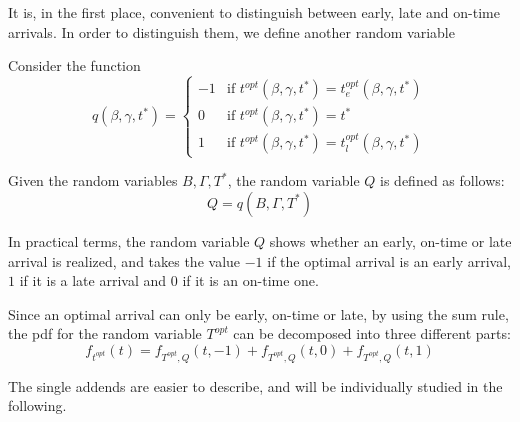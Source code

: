 It is, in the first place,
convenient to distinguish between early, late and on-time arrivals.
In order to distinguish them, we define another random variable
\begin{definition}
  Consider the function
  \begin{equation*}
    q(\beta, \gamma, t^*) =
    \begin{cases}
      -1 & \text{if } t^{opt}(\beta, \gamma, t^*) = t_e^{opt}(\beta, \gamma, t^*) \\
      0 & \text{if } t^{opt}(\beta, \gamma, t^*) = t^* \\
      1 & \text{if } t^{opt}(\beta, \gamma, t^*) = t_l^{opt}(\beta, \gamma, t^*)
    \end{cases}
  \end{equation*}

  Given the random variables \(B, \Gamma, T^*\), the random variable \(Q\) is defined as follows:
  \begin{equation*}
    Q  = q(B, \Gamma, T^*)
  \end{equation*}
\end{definition}

In practical terms, the random variable \(Q\) shows whether an early, on-time or late arrival is realized,
and takes the value \(-1\) if the optimal arrival is an early arrival,
\(1\) if it is a late arrival and \(0\) if it is an on-time one.

Since an optimal arrival can only be early, on-time or late,
by using the sum rule, the pdf for the random variable \(T^{opt}\) can be decomposed into three different parts:
\begin{equation}
  \label{eq:pdf-decomposed-q}
  f_{t^{opt}}(t) = f_{T^{opt}, Q}(t, -1) + f_{T^{opt}, Q}(t, 0) + f_{T^{opt}, Q}(t, 1)
\end{equation}

The single addends are easier to describe,
and will be individually studied in the following.
